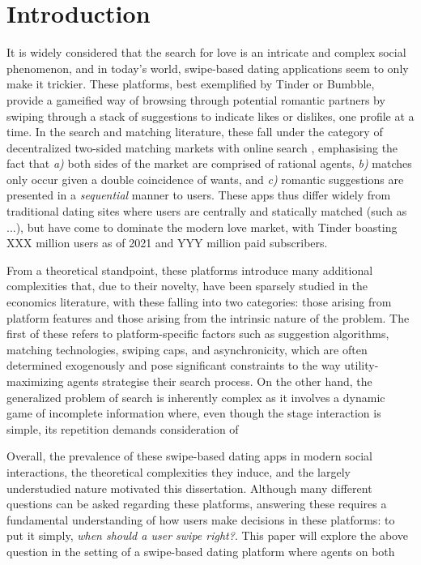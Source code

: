 \section{Introduction}
\label{sec:Introduction} 

It is widely considered that the search for love is an intricate and complex social phenomenon, and in today's world, swipe-based dating applications seem to only make it trickier. 
These platforms, best exemplified by Tinder or Bumbble, provide a gameified way of browsing through potential romantic partners by swiping through a stack of suggestions to indicate likes or dislikes, one profile at a time. 
In the search and matching literature, these fall under the category of decentralized two-sided matching markets with online search \citep{kanoria2021facilitating}, emphasising the fact that \textit{a)} both sides of the market are comprised of rational agents, \textit{b)} matches only occur given a double coincidence of wants, and \textit{c)} romantic suggestions are presented in a \textit{sequential} manner to users. 
These apps thus differ widely from traditional dating sites where users are centrally and statically matched (such as ...), but have come to dominate the modern love market, with Tinder boasting XXX million users as of 2021 and YYY million paid subscribers.


From a theoretical standpoint, these platforms introduce many additional complexities that, due to their novelty, have been sparsely studied in the economics literature, with these falling into two categories: those arising from platform features and those arising from the intrinsic nature of the problem. 
The first of these refers to platform-specific factors such as suggestion algorithms, matching technologies, swiping caps, and asynchronicity, which are often determined exogenously and pose significant constraints to the way utility-maximizing agents strategise their search process. 
On the other hand, the generalized problem of search is inherently complex as it involves a dynamic game of incomplete information where, even though the stage interaction is simple, its repetition demands consideration of 


Overall, the prevalence of these swipe-based dating apps in modern social interactions, the theoretical complexities they induce, and the largely understudied nature motivated this dissertation. 
Although many different questions can be asked regarding these platforms, answering these requires a fundamental understanding of how users make decisions in these platforms: to put it simply, \textit{when should a user swipe right?}. 
This paper will explore the above question in the setting of a swipe-based dating platform where agents on both 


